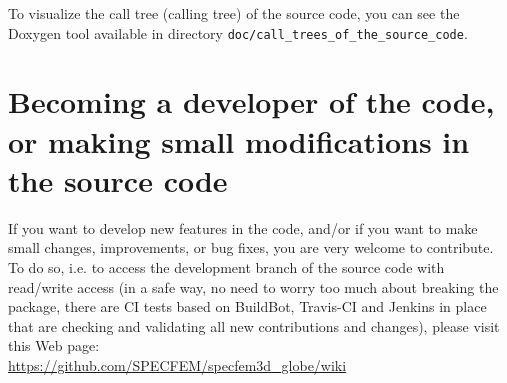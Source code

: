 To visualize the call tree (calling tree) of the source code, you can see the Doxygen tool available in directory \texttt{doc/call\_trees\_of\_the\_source\_code}.

\section{Becoming a developer of the code, or making small modifications in the source code}

If you want to develop new features in the code, and/or if you want to make small changes, improvements, or bug fixes, you are very welcome to contribute. To do so, i.e. to access the development branch of the source code with read/write access (in a safe way, no need to worry too much about breaking the package, there are CI tests based on BuildBot, Travis-CI and Jenkins in place that are checking and validating all new contributions and changes), please visit this Web page:\\
\url{https://github.com/SPECFEM/specfem3d_globe/wiki}


